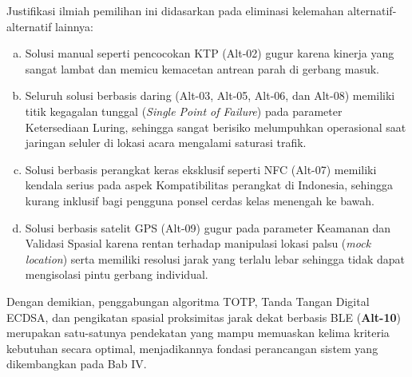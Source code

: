 Justifikasi ilmiah pemilihan ini didasarkan pada eliminasi kelemahan alternatif-alternatif lainnya:
\begin{enumerate}[a)]
    \item Solusi manual seperti pencocokan KTP (Alt-02) gugur karena kinerja yang sangat lambat dan memicu kemacetan antrean parah di gerbang masuk.
    \item Seluruh solusi berbasis daring (Alt-03, Alt-05, Alt-06, dan Alt-08) memiliki titik kegagalan tunggal (\textit{Single Point of Failure}) pada parameter Ketersediaan Luring, sehingga sangat berisiko melumpuhkan operasional saat jaringan seluler di lokasi acara mengalami saturasi trafik.
    \item Solusi berbasis perangkat keras eksklusif seperti NFC (Alt-07) memiliki kendala serius pada aspek Kompatibilitas perangkat di Indonesia, sehingga kurang inklusif bagi pengguna ponsel cerdas kelas menengah ke bawah.
    \item Solusi berbasis satelit GPS (Alt-09) gugur pada parameter Keamanan dan Validasi Spasial karena rentan terhadap manipulasi lokasi palsu (\textit{mock location}) serta memiliki resolusi jarak yang terlalu lebar sehingga tidak dapat mengisolasi pintu gerbang individual.
\end{enumerate}

Dengan demikian, penggabungan algoritma TOTP, Tanda Tangan Digital ECDSA, dan pengikatan spasial proksimitas jarak dekat berbasis BLE (\textbf{Alt-10}) merupakan satu-satunya pendekatan yang mampu memuaskan kelima kriteria kebutuhan secara optimal, menjadikannya fondasi perancangan sistem yang dikembangkan pada Bab IV.